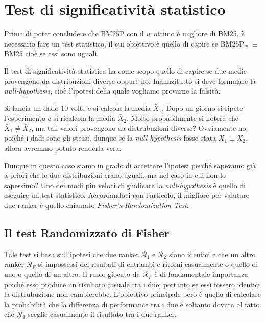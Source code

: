 \section{Test di significatività statistico}

Prima di poter concludere che BM25P con il $w$ ottimo è migliore di BM25, è necessario
fare un test statistico, il cui obiettivo è quello di capire se $\text{BM25P}_w$ $\equiv$ BM25
cioè se essi sono uguali.

Il test di significatività statistica ha come scopo
quello di capire se due medie provengono da distribuzioni diverse oppure no.
Inannzitutto si deve formulare la \textit{null-hypothesis}, cioè l'ipotesi
della quale vogliamo provarne la falsità.

\begin{esempio}
	Si lancia un dado 10 volte e si calcola la media $\bar{X}_1$. Dopo un giorno si ripete l'esperimento
	e si ricalcola la media $\bar{X}_2$. Molto probabilmente si noterà che $\bar{X}_1 \neq \bar{X}_2$,
	ma tali valori provengono da distrubuzioni diverse?
	Ovviamente no, poiché i dadi sono gli stessi, dunque se la \textit{null-hypothesis} fosse
	stata $X_1 \equiv X_2$, allora avremmo potuto renderla vera.
\end{esempio}

Dunque in questo caso siamo in grado di accettare l'ipotesi perché
sapevamo già a priori che le due distribuzioni erano uguali, ma nel caso
in cui non lo sapessimo?
Uno dei modi più veloci di giudicare la \textit{null-hypothesis} è quello di eseguire un test statistico.
Accordandoci con l'articolo\cite{10.1145/1321440.1321528}, il migliore per valutare
due ranker è quello chiamato \textit{Fisher's Randomization Test}.

\subsection{Il test Randomizzato di Fisher}
Tale test si basa sull'ipotesi che due ranker $\mathcal{R}_1 $ e $\mathcal{R}_2$ siano identici
e che un altro ranker $\mathcal{R}_F$ si impossessi dei risultati di entrambi e
ritorni casualmente o quello di uno o quello di un altro.
Il ruolo giocato da $\mathcal{R}_F$ è di fondamentale importanza poiché esso produce un risultato
casuale tra i due; pertanto se essi fossero identici la distrubuzione non cambierebbe.
L'obiettivo principale però è quello di calcolare la probabilità che la differenza
di performance tra i due è soltanto dovuta al fatto che $\mathcal{R}_3$ sceglie casualmente
il risultato tra i due ranker.

